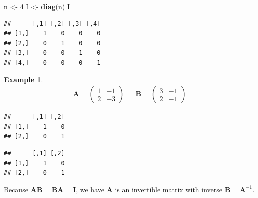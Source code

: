 \documentclass[
]{book}
\newenvironment{Shaded}{\begin{snugshade}}{\end{snugshade}}
\newcommand{\CommentTok}[1]{\textcolor[rgb]{0.56,0.35,0.01}{\textit{#1}}}
\newcommand{\DecValTok}[1]{\textcolor[rgb]{0.00,0.00,0.81}{#1}}
\newcommand{\KeywordTok}[1]{\textcolor[rgb]{0.13,0.29,0.53}{\textbf{#1}}}
\newcommand{\NormalTok}[1]{#1}
\newcommand{\OperatorTok}[1]{\textcolor[rgb]{0.81,0.36,0.00}{\textbf{#1}}}
\newcommand{\StringTok}[1]{\textcolor[rgb]{0.31,0.60,0.02}{#1}}
\theoremstyle{definition}
\theoremstyle{definition}
\newtheorem{example}{Example}[chapter]
\theoremstyle{definition}
\theoremstyle{definition}
\theoremstyle{remark}
\begin{document}
\begin{Shaded}
\begin{Highlighting}[]
\NormalTok{n <-}\StringTok{ }\DecValTok{4}
\NormalTok{I <-}\StringTok{ }\KeywordTok{diag}\NormalTok{(n)}
\NormalTok{I}
\end{Highlighting}
\end{Shaded}

\begin{verbatim}
##      [,1] [,2] [,3] [,4]
## [1,]    1    0    0    0
## [2,]    0    1    0    0
## [3,]    0    0    1    0
## [4,]    0    0    0    1
\end{verbatim}

\begin{example}
\[
\begin{aligned}
\mathbf{A} = \begin{pmatrix} 1 & -1 \\ 2 & -3 \end{pmatrix} && \mathbf{B} = \begin{pmatrix} 3 & -1 \\ 2 & -1 \end{pmatrix}
\end{aligned}
\]

\begin{Shaded}
\end{Shaded}

\begin{verbatim}
##      [,1] [,2]
## [1,]    1    0
## [2,]    0    1
\end{verbatim}

\begin{Shaded}
\end{Shaded}

\begin{verbatim}
##      [,1] [,2]
## [1,]    1    0
## [2,]    0    1
\end{verbatim}

Because \(\mathbf{A} \mathbf{B} = \mathbf{B} \mathbf{A} = \mathbf{I}\), we have \(\mathbf{A}\) is an invertible matrix with inverse \(\mathbf{B} = \mathbf{A}^{-1}\).
\end{example}
\end{document}

